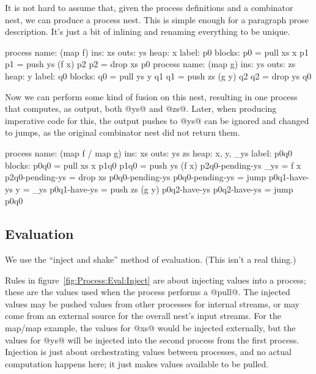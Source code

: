 It is not hard to assume that, given the process definitions and a combinator nest, we can produce a process nest.
This is simple enough for a paragraph prose description.
It's just a bit of inlining and renaming everything to be unique.

\begin{code}
process
    name: (map f)
     ins: xs
    outs: ys
    heap: {x}
   label: p0
  blocks: p0 = pull xs    x  p1
          p1 = push ys (f x) p2
          p2 = drop xs       p0
process
    name: (map g)
     ins: ys
    outs: zs
    heap: {y}
   label: q0
  blocks: q0 = pull ys    y  q1
          q1 = push zs (g y) q2
          q2 = drop ys       q0
\end{code}

Now we can perform some kind of fusion on this nest, resulting in one process that computes, as output, both @ys@ and @zs@.
Later, when producing imperative code for this, the output pushes to @ys@ can be ignored and changed to jumps, as the original combinator nest did not return them.

\begin{code}
process
    name: (map f / map g)
     ins: xs
    outs: ys zs
    heap: {x, y, _ys}
   label: p0q0
  blocks: p0q0            = pull xs    x  p1q0
          p1q0            = push ys (f x) p2q0-pending-ys { _ys = f x }
          p2q0-pending-ys = drop xs       p0q0-pending-ys
          p0q0-pending-ys = jump          p0q1-have-ys    { y = _ys }
          p0q1-have-ys    = push zs (g y) p0q2-have-ys
          p0q2-have-ys    = jump          p0q0
\end{code}

\subsection{Evaluation}
\label{s:Process:Eval}



We use the ``inject and shake'' method of evaluation. (This isn't a real thing.)

Rules in figure~\ref{fig:Process:Eval:Inject} are about injecting values into a process; these are the values used when the process performs a @pull@.
The injected values may be pushed values from other processes for internal streams, or may come from an external source for the overall nest's input streams.
For the map/map example, the values for @xs@ would be injected externally, but the values for @ys@ will be injected into the second process from the first process.
Injection is just about orchestrating values between processes, and no actual computation happens here; it just makes values available to be pulled.

